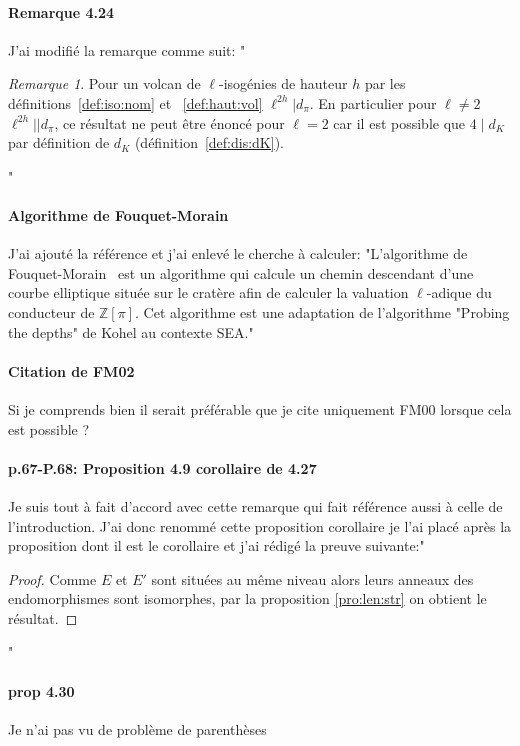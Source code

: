 \documentclass[10pt,a4paper]{article}
\theoremstyle{plain}
\theoremstyle{definition}
\theoremstyle{definition}
\theoremstyle{definition}
\theoremstyle{definition}
\theoremstyle{definition}
\theoremstyle{remark}
\newtheorem{rem}[thm]{Remarque}
\theoremstyle{remark}
\theoremstyle{definition}
\begin{document}
\paragraph{Remarque 4.24}{J'ai modifié la remarque comme suit:
"\begin{rem} 
\label{rem:lie:dp:dk}
Pour un volcan de $\ell$-isogénies de hauteur $h$ par les 
définitions~\ref{def:iso:nom} et ~\ref{def:haut:vol} $\ell^{2h} | d_{\pi}$.
En particulier pour $\ell \neq 2$ $\ell^{2h}||d_{\pi}$, ce résultat ne peut être 
énoncé  pour $\ell=2$ car il est possible que $4 \mid d_K$ par définition de $d_K$
(définition~\ref{def:dis:dK}).
\end{rem}"}

\paragraph{Algorithme de Fouquet-Morain}{J'ai ajouté la référence et j'ai 
enlevé le cherche à calculer: "L'algorithme de 
Fouquet-Morain~\cite{FouquetMorain02} est un algorithme qui 
calcule un chemin descendant d'une courbe elliptique située sur le cratère afin
de calculer la valuation $\ell$-adique du conducteur de $\mathbb{Z}[\pi]$. Cet
algorithme est une adaptation de l'algorithme "Probing the depths" de Kohel \cite[Section 4.2]{Kohel96} au contexte SEA."}

\paragraph{Citation de FM02}{Si je comprends bien il serait préférable que je cite uniquement FM00 lorsque cela est possible ?}

\paragraph{p.67-P.68: Proposition 4.\color{red}{2}\color{black}9 corollaire de 
4.27}{Je suis tout à fait d'accord avec cette remarque qui fait référence aussi
à celle de l'introduction. J'ai donc renommé cette proposition corollaire je 
l'ai placé après la proposition dont il est le corollaire et j'ai rédigé la 
preuve suivante:"\begin{proof}
Comme $E$ et $E'$ sont situées au même niveau alors leurs anneaux 
des endomorphismes sont isomorphes, par la proposition \ref{pro:len:str} on 
obtient le résultat.
\end{proof}"}

\paragraph{prop 4.30}{Je n'ai pas vu de problème de parenthèses}
\end{document}
